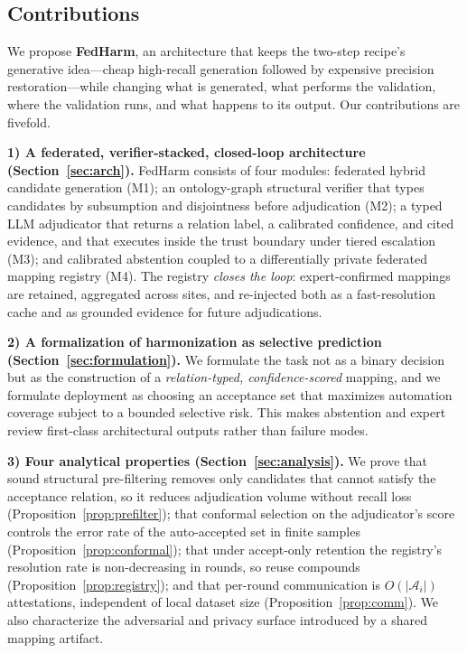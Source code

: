 \documentclass[conference]{IEEEtran}
\newcommand{\att}{\mathcal{A}}
\begin{document}
\subsection{Contributions}

We propose \textbf{FedHarm}, an architecture that keeps the two-step recipe's generative idea---cheap high-recall generation followed by expensive precision restoration---while changing what is generated, what performs the validation, where the validation runs, and what happens to its output. Our contributions are fivefold.

\textbf{1) A federated, verifier-stacked, closed-loop architecture (Section~\ref{sec:arch}).} FedHarm consists of four modules: federated hybrid candidate generation (M1); an ontology-graph structural verifier that types candidates by subsumption and disjointness before adjudication (M2); a typed LLM adjudicator that returns a relation label, a calibrated confidence, and cited evidence, and that executes inside the trust boundary under tiered escalation (M3); and calibrated abstention coupled to a differentially private federated mapping registry (M4). The registry \emph{closes the loop}: expert-confirmed mappings are retained, aggregated across sites, and re-injected both as a fast-resolution cache and as grounded evidence for future adjudications.

\textbf{2) A formalization of harmonization as selective prediction (Section~\ref{sec:formulation}).} We formulate the task not as a binary decision but as the construction of a \emph{relation-typed, confidence-scored} mapping, and we formulate deployment as choosing an acceptance set that maximizes automation coverage subject to a bounded selective risk. This makes abstention and expert review first-class architectural outputs rather than failure modes.

\textbf{3) Four analytical properties (Section~\ref{sec:analysis}).} We prove that sound structural pre-filtering removes only candidates that cannot satisfy the acceptance relation, so it reduces adjudication volume without recall loss (Proposition~\ref{prop:prefilter}); that conformal selection on the adjudicator's score controls the error rate of the auto-accepted set in finite samples (Proposition~\ref{prop:conformal}); that under accept-only retention the registry's resolution rate is non-decreasing in rounds, so reuse compounds (Proposition~\ref{prop:registry}); and that per-round communication is $O(|\att_i|)$ attestations, independent of local dataset size (Proposition~\ref{prop:comm}). We also characterize the adversarial and privacy surface introduced by a shared mapping artifact.
\end{document}
